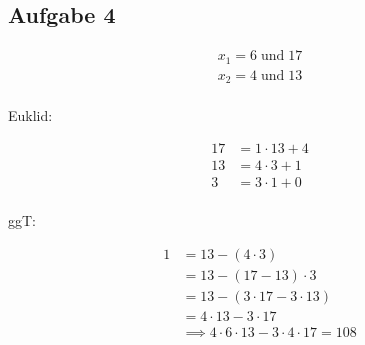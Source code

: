   \subsection*{Aufgabe 4}
  \begin{align*}
    x_1 = 6 \; \text{und} \; 17 \\
    x_2 = 4 \; \text{und} \; 13 \\
  \end{align*}

  Euklid:

  \begin{align*}
    17 &= 1 \cdot 13 + 4 \\
    13 &= 4 \cdot 3 + 1 \\
    3 &= 3 \cdot 1 + 0 \\
  \end{align*}

  ggT:

  \begin{align*}
    1 &= 13 - (4 \cdot 3) \\
      &= 13 - (17 - 13) \cdot 3 \\
      &= 13 - (3 \cdot 17 - 3 \cdot 13) \\
      &= 4 \cdot 13 - 3 \cdot 17 \\
      &\implies 4 \cdot 6\cdot 13 - 3 \cdot 4 \cdot 17 = 108\\
  \end{align*}



